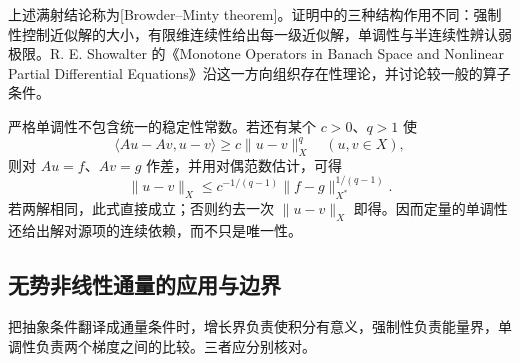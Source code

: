 上述满射结论称为[Browder--Minty theorem]。证明中的三种结构作用不同：强制性控制近似解的大小，有限维连续性给出每一级近似解，单调性与半连续性辨认弱极限。R. E. Showalter 的《Monotone Operators in Banach Space and Nonlinear Partial Differential Equations》\cite[Chapter II, Section 2, pp. 37--39]{Showalter1997Monotone}沿这一方向组织存在性理论，并讨论较一般的算子条件。

\ProseParagraphBreak

严格单调性不包含统一的稳定性常数。若还有某个 \(c>0\)、\(q>1\) 使
\[
 \langle Au-Av,u-v\rangle\ge c\|u-v\|_X^q
 \quad(u,v\in X),
\]
则对 \(Au=f\)、\(Av=g\) 作差，并用对偶范数估计，可得
\[
 \|u-v\|_X\le c^{-1/(q-1)}\|f-g\|_{X^*}^{1/(q-1)}.
\]
若两解相同，此式直接成立；否则约去一次 \(\|u-v\|_X\) 即得。因而定量的单调性还给出解对源项的连续依赖，而不只是唯一性。

\subsection{无势非线性通量的应用与边界}
\label{b2:subsec:H20404}

把抽象条件翻译成通量条件时，增长界负责使积分有意义，强制性负责能量界，单调性负责两个梯度之间的比较。三者应分别核对。

